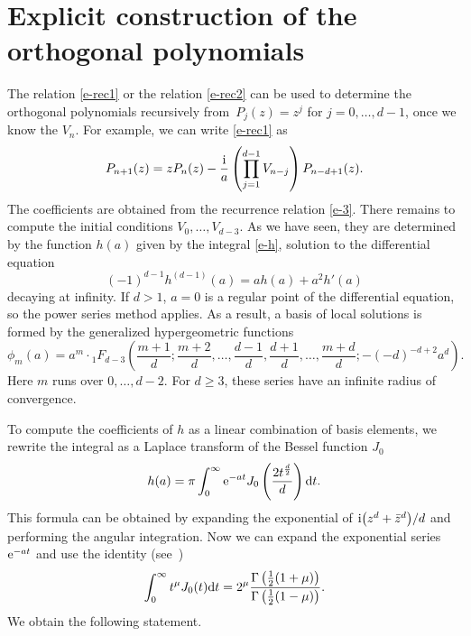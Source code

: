 \documentclass[pdftex]{sigma}
\numberwithin{equation}{section}
\theoremstyle{definition}
\begin{document}
\section{Explicit construction of the orthogonal polynomials}\label{s-4}
The relation \eqref{e-rec1} or the relation \eqref{e-rec2} can be used to determine the orthogonal
polynomials recursively from~${P_j(z)=z^j}$ for $j=0,\dots,d-1$, once we know the $V_n$.
For example, we can write \eqref{e-rec1} as
\begin{equation}\label{e-3tr}
 P_{n+1}(z)=zP_n(z)-\frac {\rm i}a\left(\prod_{j=1}^{d-1}V_{n-j}\right) P_{n-d+1}(z).
\end{equation}
The coefficients are obtained from the recurrence relation \eqref{e-3}. There remains to compute the initial conditions $V_0,\dots,V_{d-3}$. As we have seen, they are determined by the function $h(a)$ given by the integral \eqref{e-h}, solution to the differential equation
\[
(-1)^{d-1}h^{(d-1)}(a)=a h(a)+a^2h'(a)
\]
decaying at infinity. If $d>1$, $a=0$ is a regular point of the differential equation, so the power series method applies. As a result, a basis of local solutions is formed by the generalized hypergeometric functions{\samepage
\begin{equation}\label{e-Bob}
 \phi_m(a)=a^m\cdot {}_1F_{d-3}\left({\frac{m+1}d;
 \frac{m+2}{d},\dots,\frac{d-1}{d},\frac{d+1}{d},\dots, \frac{m+d}{d}};-
 (-d)^{-d+2}a^d\right).
\end{equation}
Here $m$ runs over $0,\dots,d-2$. For $d\geq3$, these series have an infinite radius of convergence.}

To compute the coefficients of $h$ as a linear combination of basis elements, we rewrite the integral as a Laplace transform of the Bessel function $J_0$
\[
 h(a)=\pi\int_0^\infty {\rm e}^{-a t} J_0\left(\frac{2t^\frac d2}{d}\right){\rm d}t.
\]
This formula can be obtained by expanding the exponential of ${\rm i}\bigl(z^d+\bar z^d\bigr)/d$ and performing the angular integration. Now we can expand the exponential series ${\rm e}^{-at}$ and use the identity (see~\cite[formula~(10.22.43)]{NIST:DLMF})
\[
 \int_0^\infty t^\mu J_0(t){\rm d}t=2^\mu
 \frac{\Gamma\left(\frac12(1+\mu)\right)}{\Gamma\left(\frac12(1-\mu)
 \right)}.
\]
We obtain the following statement.
\end{document}
